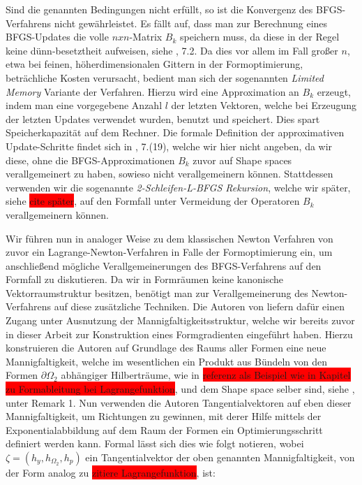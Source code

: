 Sind die genannten Bedingungen nicht erfüllt, so ist die Konvergenz des BFGS-Verfahrens nicht gewährleistet. Es fällt auf, dass man zur Berechnung eines BFGS-Updates die volle $nxn$-Matrix $B_k$ speichern muss, da diese in der Regel keine dünn-besetztheit aufweisen, siehe \cite{Nocedal}, 7.2. Da dies vor allem im Fall großer $n$, etwa bei feinen, höherdimensionalen Gittern in der Formoptimierung, beträchliche Kosten verursacht, bedient man sich der sogenannten \textit{Limited Memory} Variante der Verfahren. Hierzu wird eine Approximation an $B_k$ erzeugt, indem man eine vorgegebene Anzahl $l$ der letzten Vektoren, welche bei Erzeugung der letzten Updates verwendet wurden, benutzt und speichert. Dies spart Speicherkapazität auf dem Rechner. Die formale Definition der approximativen Update-Schritte findet sich in \cite{Nocedal}, 7.(19), welche wir hier nicht angeben, da wir diese, ohne die BFGS-Approximationen $B_k$ zuvor auf Shape spaces verallgemeinert zu haben, sowieso nicht verallgemeinern können. Stattdessen verwenden wir die sogenannte \textit{2-Schleifen-L-BFGS Rekursion}, welche wir später, siehe \colorbox{red}{cite später}, auf den Formfall unter Vermeidung der Operatoren $B_k$ verallgemeinern können.

Wir führen nun in analoger Weise zu dem klassischen Newton Verfahren von zuvor ein Lagrange-Newton-Verfahren in Falle der Formoptimierung ein, um anschließend mögliche Verallgemeinerungen des BFGS-Verfahrens auf den Formfall zu diskutieren.
Da wir in Formräumen keine kanonische Vektorraumstruktur besitzen, benötigt man zur Verallgemeinerung des Newton-Verfahrens auf diese zusätzliche Techniken.
Die Autoren von \cite{LagrangeNewton} liefern dafür einen Zugang unter Ausnutzung der Mannigfaltigkeitsstruktur, welche wir bereits zuvor in dieser Arbeit zur Konstruktion eines Formgradienten eingeführt haben. Hierzu konstruieren die Autoren auf Grundlage des Raums aller Formen eine neue Mannigfaltigkeit, welche im wesentlichen ein Produkt aus Bündeln von den Formen $\partial\Omega_2$ abhängiger Hilberträume, wie in \colorbox{red}{referenz als Beispiel wie in Kapitel zu Formableitung bei Lagrangefunktion}, und dem Shape space selber sind, siehe \cite{LagrangeNewton}, unter Remark 1.  Nun verwenden die Autoren Tangentialvektoren auf eben dieser Mannigfaltigkeit, um Richtungen zu gewinnen, mit derer Hilfe mittels der Exponentialabbildung auf dem Raum der Formen ein Optimierungsschritt definiert werden kann. Formal lässt sich dies wie folgt notieren, wobei $\zeta = (h_y, h_{\Omega_2}, h_p)$ ein Tangentialvektor der oben genannten Mannigfaltigkeit, von der Form analog zu \colorbox{red}{zitiere Lagrangefunktion}, ist:

